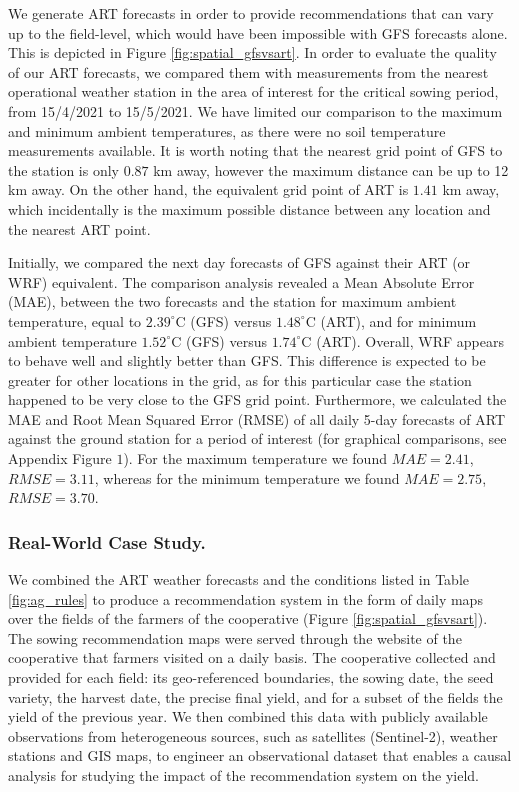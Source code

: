 \documentclass[letterpaper]{article} %
\begin{document}
We generate ART forecasts in order to provide recommendations that can vary up to the field-level, which would have been impossible with GFS forecasts alone. This is depicted in Figure \ref{fig:spatial_gfsvsart}. In order to evaluate the quality of our ART forecasts, we compared them with measurements from the nearest operational weather station in the area of interest for the critical sowing period, from 15/4/2021 to 15/5/2021. We have limited our comparison to the maximum and minimum ambient temperatures, as there were no soil temperature measurements available. It is worth noting that the nearest grid point of GFS to the station is only $0.87$ km away, however the maximum distance can be up to 12 km away. On the other hand, the equivalent grid point of ART is $1.41$ km away, which incidentally is the maximum possible distance between any location and the nearest ART point.

Initially, we compared the next day forecasts of GFS against their ART (or WRF) equivalent. The comparison analysis revealed a Mean Absolute Error (MAE), between the two forecasts and the station for maximum ambient temperature, equal to $2.39^\circ$C (GFS) versus $1.48^\circ$C (ART), and for minimum ambient temperature $1.52^\circ$C (GFS) versus $1.74^\circ$C (ART). Overall, WRF appears to behave well and slightly better than GFS. This difference is expected to be greater for other locations in the grid, as for this particular case the station happened to be very close to the GFS grid point.
Furthermore, we calculated the MAE and Root Mean Squared Error (RMSE) of all daily 5-day forecasts of ART against the ground station for a period of interest (for graphical comparisons, see Appendix Figure $1$). For the maximum temperature we found $MAE=2.41$, $RMSE=3.11$, whereas for the minimum temperature we found $MAE=2.75$, $RMSE=3.70$.

\subsubsection{Real-World Case Study.}


We combined the ART weather forecasts and the conditions listed in Table \ref{fig:ag_rules} to produce a recommendation system in the form of daily maps over the fields of the farmers of the cooperative (Figure \ref{fig:spatial_gfsvsart}). The sowing recommendation maps were served through the website of the cooperative that farmers visited on a daily basis.
The cooperative collected and provided for each field: its geo-referenced boundaries, the sowing date, the seed variety, the harvest date, the precise final yield, and for a subset of the fields the yield of the previous year. We then combined this data with publicly available observations from heterogeneous sources, such as satellites (Sentinel-2), weather stations and GIS maps, to engineer an observational dataset that enables a causal analysis for studying the impact of the recommendation system on the yield.
\end{document}
